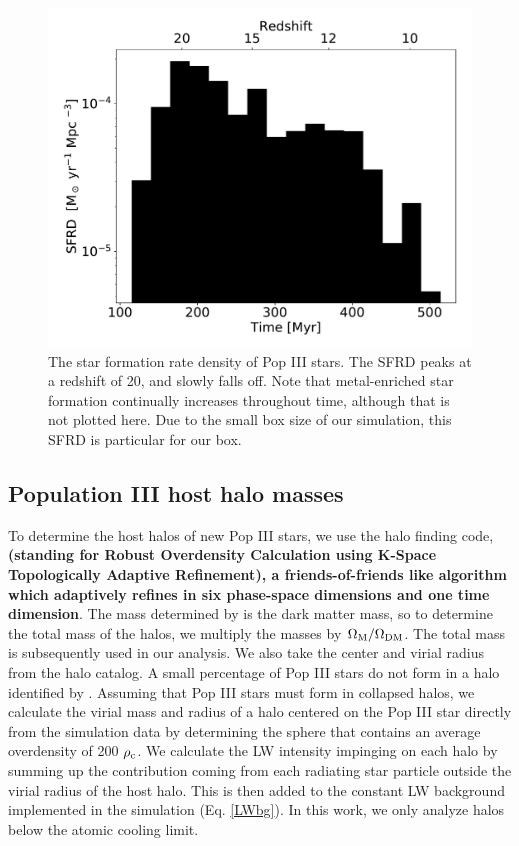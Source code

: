 \documentclass[fleqn,usenatbib]{mnras}
\begin{document}
\begin{figure}
	\includegraphics[width=\columnwidth]{images/pop3_SFR_bar.pdf}
    \caption{The star formation rate density of Pop III stars. The SFRD peaks at a redshift of 20, and slowly falls off. Note that metal-enriched star formation continually increases throughout time, although that is not plotted here. Due to the small box size of our simulation, this SFRD is particular for our box.}
    \label{fig:pop3_SFR_bar}
\end{figure}

\subsection{Population III host halo masses}
 To determine the host halos of new Pop III stars, we use the halo finding code, \rockstar{} \citep{rockstar} \textbf{(standing for Robust Overdensity Calculation using K-Space Topologically Adaptive Refinement), a friends-of-friends like algorithm which adaptively refines in six phase-space dimensions and one time dimension}. The mass determined by \rockstar{} is the dark matter mass, so to determine the total mass of the halos, we multiply the masses by $\Omega_{\rm M}/\Omega_{\rm DM}$. The total mass is subsequently used in our analysis. We also take the center and virial radius from the \rockstar{} halo catalog. A small percentage of Pop III stars do not form in a halo identified by \rockstar{}. Assuming that Pop III stars must form in collapsed halos, we calculate the virial mass and radius of a halo centered on the Pop III star directly from the simulation data by determining the sphere that contains an average overdensity of 200 $\rho_{\rm c}$. We calculate the LW intensity impinging on each halo by summing up the contribution coming from each radiating star particle outside the virial radius of the host halo. This is then added to the constant LW background implemented in the simulation (Eq. \ref{LWbg}). In this work, we only analyze halos below the atomic cooling limit. 
\end{document}
